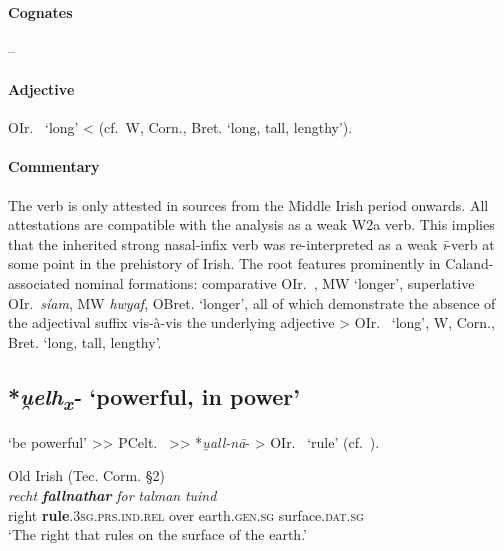 \documentclass[output=paper,colorlinks,citecolor=brown]{langscibook}
\begin{document}
\paragraph*{Cognates}  -- 

\paragraph*{Adjective} 

OIr.\  ‘long’ <  (cf.\ W, Corn., Bret.    ‘long, tall, lengthy’).

\paragraph*{Commentary}

The verb is only attested in sources from the Middle Irish period onwards. All attestations are compatible with the analysis as a weak W2a verb. This implies that the inherited strong nasal-infix verb was re-interpreted as a weak \textit{ī}-verb at some point in the prehistory of Irish. The root features prominently in Caland-associated  nominal formations: comparative OIr.\ , MW  ‘longer’, superlative OIr.\ \textit{síam}, MW \textit{hwyaf}, OBret.  ‘longer’, all of which demonstrate the absence of the adjectival suffix  vis-à-vis the underlying adjective  > OIr.\   ‘long’, W, Corn., Bret.    ‘long, tall, lengthy’.

\subsection{*\textit{u̯elh\textsubscript{x}-} ‘powerful, in power’}
\label{sec:NIPpowerful}

 ‘be powerful’ >{>} PCelt.\  >{>} *\textit{u̯all-nā}- > OIr.\  ‘rule’ (cf.\ \citealt[655--656]{Schumacher2004}).


\begin{exe}
    \ex Old Irish (Tec. Corm. §2)\label{ex:NIPpowerful}\\
        \gll \textit{recht} {\textit{\textbf{fallnathar}} } \textit{for} \textit{talman} \textit{tuind} \\
        right \textbf{rule}.\textsc{3sg.prs.ind.rel} over earth.\textsc{gen.sg} surface.\textsc{dat.sg}\\
        \glt ‘The right that rules on the surface of the earth.’\\
\end{exe}
\end{document}
